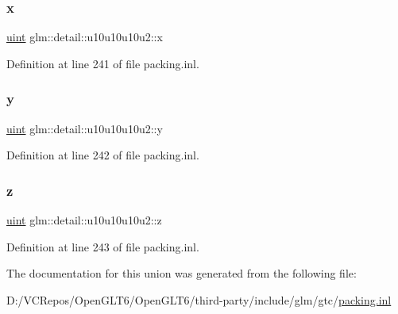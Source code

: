 \subsubsection{\texorpdfstring{x}{x}}
{\footnotesize\ttfamily \mbox{\hyperlink{group__core__precision_ga4fd29415871152bfb5abd588334147c8}{uint}} glm\+::detail\+::u10u10u10u2\+::x}



Definition at line 241 of file packing.\+inl.

\mbox{\label{unionglm_1_1detail_1_1u10u10u10u2_a7eb44cac4892d2587f8b5f67681f8e85}} 
\subsubsection{\texorpdfstring{y}{y}}
{\footnotesize\ttfamily \mbox{\hyperlink{group__core__precision_ga4fd29415871152bfb5abd588334147c8}{uint}} glm\+::detail\+::u10u10u10u2\+::y}



Definition at line 242 of file packing.\+inl.

\mbox{\label{unionglm_1_1detail_1_1u10u10u10u2_a8c4c851343129c55d86d6b0b7aed9b4f}} 
\subsubsection{\texorpdfstring{z}{z}}
{\footnotesize\ttfamily \mbox{\hyperlink{group__core__precision_ga4fd29415871152bfb5abd588334147c8}{uint}} glm\+::detail\+::u10u10u10u2\+::z}



Definition at line 243 of file packing.\+inl.



The documentation for this union was generated from the following file\+:\begin{DoxyCompactItemize}
\item 
D\+:/\+V\+C\+Repos/\+Open\+G\+L\+T6/\+Open\+G\+L\+T6/third-\/party/include/glm/gtc/\mbox{\hyperlink{packing_8inl}{packing.\+inl}}\end{DoxyCompactItemize}
